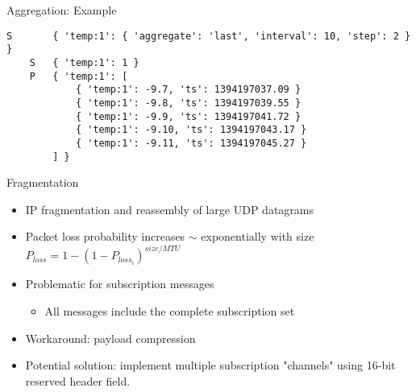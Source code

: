 \documentclass{beamer}
\begin{document}
\begin{frame}[fragile]{Aggregation: Example}
\footnotesize
\begin{verbatim}
S       { 'temp:1': { 'aggregate': 'last', 'interval': 10, 'step': 2 } }
    S   { 'temp:1': 1 }
    P   { 'temp:1': [
            { 'temp:1': -9.7, 'ts': 1394197037.09 }
            { 'temp:1': -9.8, 'ts': 1394197039.55 }
            { 'temp:1': -9.9, 'ts': 1394197041.72 }
            { 'temp:1': -9.10, 'ts': 1394197043.17 }
            { 'temp:1': -9.11, 'ts': 1394197045.27 }
        ] }
\end{verbatim}
\end{frame}

\begin{frame}{Fragmentation}
\begin{itemize}
	\item IP fragmentation and reassembly of large UDP datagrams
	\item 	Packet loss probability increases $\sim$ exponentially with size \\
			$P_{loss} = 1 - (1 - P_{loss_i})^{size / MTU}$
	\item Problematic for subscription messages
	\begin{itemize}
		\item All messages include the complete subscription set
	\end{itemize}
	\item Workaround: payload compression
	\item Potential solution: implement multiple subscription "channels" using 16-bit reserved header field.
\end{itemize}
\end{frame}
\end{document}
